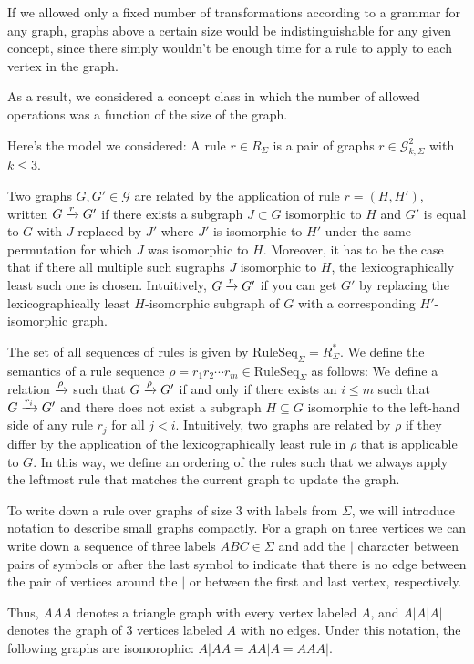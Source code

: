 \documentclass[]{article}
\def\RuleSeq{\mathrm{RuleSeq}\xspace}
\def\Graphs{\mathcal{G}\xspace}
\begin{document}
If we allowed only a fixed number of transformations according to a grammar for any graph, graphs above a certain size would be indistinguishable for any given concept, since there simply wouldn't be enough time for a rule to apply to each vertex in the graph.

As a result, we considered a concept class in which the number of allowed operations was a function of the size of the graph.

Here's the model we considered: A rule $r \in R_{\Sigma}$ is a pair of graphs $r \in \Graphs_{k,\Sigma}^2$ with $k \leq 3$.

Two graphs $G,G' \in \Graphs$ are related by the application of rule $r = (H,H')$, written $G \xrightarrow{r} G'$ if there exists a subgraph $J \subset G$ isomorphic to $H$ and $G'$ is equal to $G$ with $J$ replaced by $J'$ where $J'$ is isomorphic to $H'$ under the same permutation for which $J$ was isomorphic to $H$. Moreover, it has to be the case that if there all multiple such sugraphs $J$ isomorphic to $H$, the lexicographically least such one is chosen. Intuitively, $G \xrightarrow{r} G'$ if you can get $G'$ by replacing the lexicographically least $H$-isomorphic subgraph of $G$ with a corresponding $H'$-isomorphic graph.

The set of all sequences of rules is given by $\RuleSeq_{\Sigma} = R_{\Sigma}^*$. We define the semantics of a rule sequence $\rho = r_1r_2\dotsm r_m \in \RuleSeq_{\Sigma}$ as follows: We define a relation $\xrightarrow{\rho}$ such that $G \xrightarrow{\rho} G'$ if and only if there exists an $i\leq m$ such that $G\xrightarrow{r_i} G'$ and there does not exist a subgraph $H \subseteq G$ isomorphic to the left-hand side of any rule $r_j$ for all $j < i$. Intuitively, two graphs are related by $\rho$ if they differ by the application of the lexicographically least rule in $\rho$ that is applicable to $G$. In this way, we define an ordering of the rules such that we always apply the leftmost rule that matches the current graph to update the graph.

To write down a rule over graphs of size $3$ with labels from $\Sigma$, we will introduce notation to describe small graphs compactly. For a graph on three vertices we can write down a sequence of three labels $ABC \in \Sigma$ and add the $|$ character between pairs of symbols or after the last symbol to indicate that there is no edge between the pair of vertices around the $|$ or between the first and last vertex, respectively.

Thus, $AAA$ denotes a triangle graph with every vertex labeled $A$, and $A|A|A|$ denotes the graph of 3 vertices labeled $A$ with no edges. Under this notation, the following graphs are isomorophic: $A|AA = AA|A = AAA|$.
\end{document}
